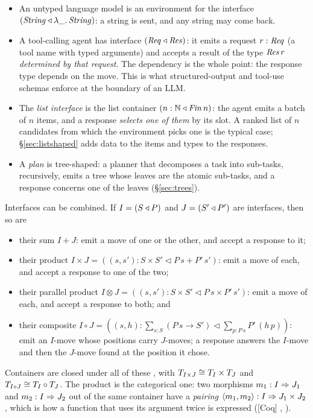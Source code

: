 \documentclass{fundam}
\begin{document}
\begin{itemize}[leftmargin=1.5em]
\item An untyped language model is an environment for the interface
  $(\mathit{String} \triangleleft \lambda\_.\,\mathit{String})$: a string is sent, and any string
  may come back.
\item A tool-calling agent has interface $(\mathit{Req} \triangleleft \mathit{Res})$: it emits a
  request $r : \mathit{Req}$ (a tool name with typed arguments) and accepts a result of the
  type $\mathit{Res}\,r$ \emph{determined by that request}.  The dependency is the whole point:
  the response type depends on the move.  This is what structured-output and tool-use
  schemas \cite{OpenAIStructured24,MCP24} enforce at the boundary of an LLM.
\item The \emph{list interface} is the list container $(n : \mathbb{N} \triangleleft \mathit{Fin}\,n)$:
  the agent emits a batch of $n$ items, and a response \emph{selects one of them} by its
  slot.  A ranked list of $n$ candidates from which the environment picks one is the
  typical case; \S\ref{sec:listshaped} adds data to the items and types to the responses.
\item A \emph{plan} is tree-shaped: a planner that decomposes a task into sub-tasks,
  recursively, emits a tree whose leaves are the atomic sub-tasks, and a response
  concerns one of the leaves (\S\ref{sec:trees}).
\end{itemize}

Interfaces can be combined.  If $I = (S \triangleleft P)$ and $J = (S' \triangleleft P')$ are interfaces,
then so are
\begin{itemize}[leftmargin=1.5em]
\item their sum $I + J$: emit a move of one or the other, and accept a response to it;
\item their product
  $I \times J = ((s,s') : S \times S' \triangleleft P\,s + P'\,s')$: emit a move of each,
  and accept a response to one of the two;
\item their parallel product
  $I \otimes J = ((s,s') : S \times S' \triangleleft P\,s \times P'\,s')$: emit a move of
  each, and accept a response to both; and
\item their composite
  $I \circ J = ((s,h) : \sum_{s:S} (P\,s \to S') \triangleleft \sum_{p : P\,s} P'\,(h\,p))$:
  emit an $I$-move whose positions carry $J$-moves; a response answers the $I$-move and
  then the $J$-move found at the position it chose.
\end{itemize}
Containers are closed under all of these
\cite{AbbottAltenkirchGhani05,NiuSpivak25}, with
$T_{I \times J} \cong T_{I} \times T_{J}$ and
$T_{I \circ J} \cong T_{I} \circ T_{J}$.  The product is the categorical one:
two morphisms $m_1 : I \Rightarrow J_1$ and $m_2 : I \Rightarrow J_2$ out of the same container have
a \emph{pairing} $\langle m_1, m_2 \rangle : I \Rightarrow J_1 \times J_2$, which is how a
function that uses its argument twice is expressed (\textsf{[Coq]} ,
).
\end{document}
